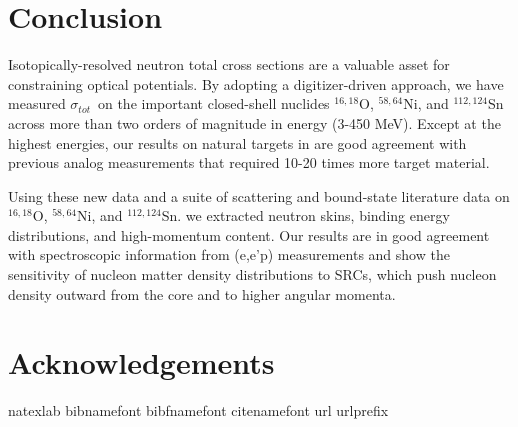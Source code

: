 \documentclass[twocolumn,secnumarabic,amssymb, nobibnotes, aps, prl,
superscriptaddress, nobalancelastpage]{revtex4}
\newcommand{\tot}{\ensuremath{\sigma_{tot}}}
\newcommand{\oSixEight}{\ensuremath{^{16,18}}O}
\newcommand{\niEightFour}{\ensuremath{^{58,64}}N\lowercase{i}}
\newcommand{\snTwelveFour}{\ensuremath{^{112,124}}S\lowercase{n}}
\begin{document}
\section{Conclusion}
Isotopically-resolved neutron total cross sections are a valuable asset for
constraining optical potentials. By adopting a digitizer-driven
approach, we have measured \tot\ on the important closed-shell nuclides
$^{16,18}$O, $^{58,64}$Ni, and $^{112,124}$Sn across more than two orders of
magnitude in energy (3-450 MeV). Except at the highest energies, our results
on natural targets in are good agreement with previous analog measurements
that required 10-20 times more target material. 

Using these new data and a suite of scattering and bound-state literature data
on \oSixEight, \niEightFour, and \snTwelveFour.
we extracted neutron skins, binding energy distributions, and high-momentum
content. Our results are in good agreement with spectroscopic information
from (e,e'p) measurements and show the sensitivity of nucleon matter density
distributions to SRCs, which push nucleon density outward from the core and
to higher angular momenta.

\section{Acknowledgements}


\begin{thebibliography}{32} \expandafter\ifx\csname
        natexlab\endcsname\relax\def\natexlab#1{#1}\fi \expandafter\ifx\csname
        bibnamefont\endcsname\relax \def\bibnamefont#1{#1}\fi
        \expandafter\ifx\csname bibfnamefont\endcsname\relax
        \def\bibfnamefont#1{#1}\fi \expandafter\ifx\csname
        citenamefont\endcsname\relax \def\citenamefont#1{#1}\fi
        \expandafter\ifx\csname url\endcsname\relax \def\url#1{\texttt{#1}}\fi
        \expandafter\ifx\csname urlprefix\endcsname\relax\def\urlprefix{URL
        }\fi \providecommand{\bibinfo}[2]{#2}
        \providecommand{\eprint}[2][]{\url{#2}}

\end{thebibliography}
\end{document}
